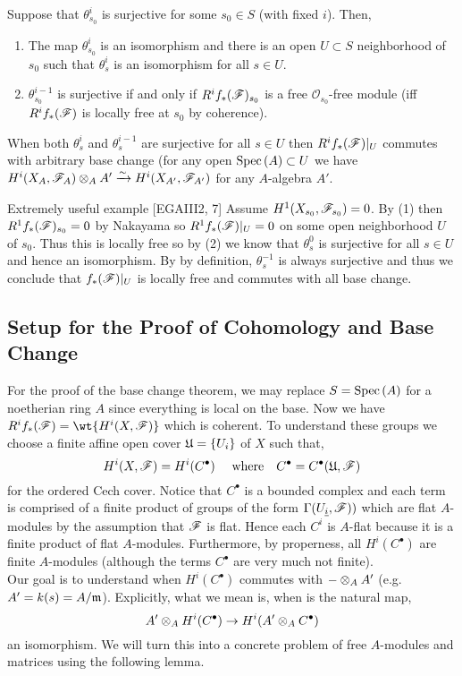 \documentclass[12pt]{article}
\begin{document}
\begin{theorem}
Suppose that $\theta^i_{s_0}$ is surjective for some $s_0 \in S$ (with fixed $i$). Then,
\begin{enumerate}
\item The map $\theta^i_{s_0}$ is an isomorphism and there is an open $U \subset S$ neighborhood of $s_0$ such that $\theta^i_s$ is an isomorphism for all $s \in U$.
\item $\theta^{i-1}_{s_0}$ is surjective if and only if $R^i f_* (\mathscr{F})_{s_0}$ is a free $\mathcal{O}_{s_0}$-free module (iff $R^i f_* (\mathscr{F})$ is locally free at $s_0$ by coherence).
\end{enumerate}
When both $\theta^i_s$ and $\theta^{i-1}_s$ are surjective for all $s \in U$ then $R^i f_*(\mathscr{F})|_U$ commutes with arbitrary base change (for any open $\mathrm{Spec}\left( A \right) \subset U$ we have $H^i(X_A, \mathscr{F}_A) \otimes_A A' \xrightarrow{\sim} H^i(X_{A'}, \mathscr{F}_{A'})$ for any $A$-algebra $A'$.
\end{theorem} 

\begin{corollary}
Extremely useful example [EGAIII2, 7] Assume $H^1(X_{s_0}, \mathscr{F}_{s_0}) = 0$. By (1) then $R^1 f_* (\mathscr{F})_{s_0} = 0$ by Nakayama so $R^1 f_*(\mathscr{F})|_{U} = 0$ on some open neighborhood $U$ of $s_0$. Thus this is locally free so by (2) we know that $\theta^0_s$ is surjective for all $s \in U$ and hence an isomorphism. By by definition, $\theta^{-1}_s$ is always surjective and thus we conclude that $f_* (\mathscr{F})|_U$ is locally free and commutes with all base change.  
\end{corollary}

\subsection{Setup for the Proof of Cohomology and Base Change}

For the proof of the base change theorem, we may replace $S = \mathrm{Spec}\left( A \right)$ for a noetherian ring $A$ since everything is local on the base. Now we have $R^i f_* (\F) = \wt{H^i(X, \F)}$ which is coherent. To understand these groups we choose a finite affine open cover $\mathfrak{U} = \{ U_i \}$ of $X$ such that,
\[ H^i(X, \mathscr{F}) = H^i(C^\bullet) \quad \text{ where} \quad C^\bullet = C^\bullet(\mathfrak{U}, \mathscr{F}) \]
for the ordered Cech cover. Notice that $C^\bullet$ is a bounded complex and each term is comprised of a finite product of groups of the form $\Gamma(U_{\underline{i}}, \mathscr{F}))$ which are flat $A$-modules by the assumption that $\mathscr{F}$ is flat. Hence each $C^i$ is $A$-flat because it is a finite product of flat $A$-modules. Furthermore, by properness, all $H^i(C^\bullet)$ are finite $A$-modules (although the terms $C^\bullet$ are very much not finite). 
\bigskip\\
Our goal is to understand when $H^i(C^\bullet)$ commutes with $- \otimes_A A'$ (e.g. $A' = k(s) = A / \mathfrak{m}$). Explicitly, what we mean is, when is the natural map,
\[ A' \otimes_A H^i(C^\bullet) \to H^i(A' \otimes_A C^\bullet) \]
an isomorphism. We will turn this into a concrete problem of free $A$-modules and matrices using the following lemma.
\end{document}

